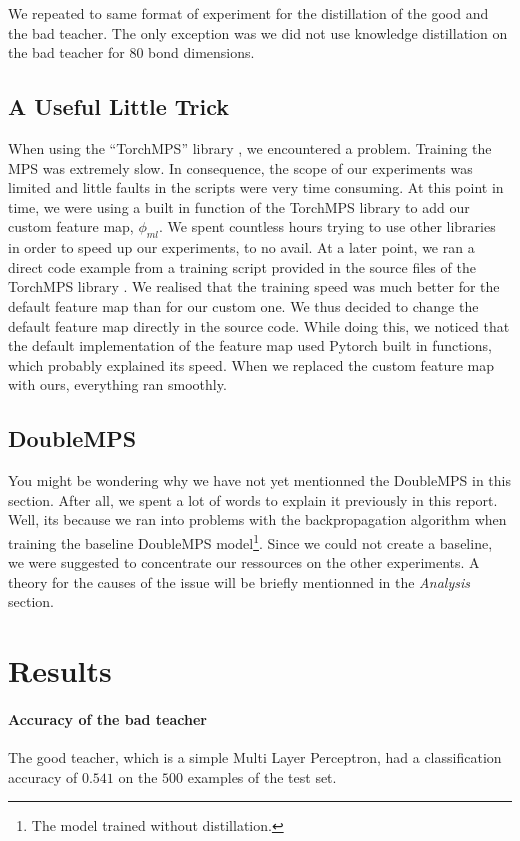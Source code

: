\documentclass{article}
\theoremstyle{definition}
\theoremstyle{definition}
\begin{document}
We repeated to same format of experiment for the distillation of the good and the bad teacher. The only exception was we did not use knowledge distillation on the bad teacher for $80$ bond dimensions.

\subsection{A Useful Little Trick}
When using the \enquote{TorchMPS} library \cite{torchmps}, we encountered a problem. Training the MPS was extremely slow. In consequence, the scope of our experiments was limited and little faults in the scripts were very time consuming. At this point in time, we were using a built in function of the TorchMPS library to add our custom feature map, $\phi_{ml}$. We spent countless hours trying to use other libraries in order to speed up our experiments, to no avail. At a later point, we ran a direct code example from a training script provided in the source files of the TorchMPS library \cite{torchmps}. We realised that the training speed was much better for the default feature map than for our custom one. We thus decided to change the default feature map directly in the source code. While doing this, we noticed that the default implementation of the feature map used Pytorch built in functions, which probably explained its speed. When we replaced the custom feature map with ours, everything ran smoothly.


\subsection{DoubleMPS}
You might be wondering why we have not yet mentionned the DoubleMPS in this section. After all, we spent a lot of words to explain it previously in this report. Well, its because we ran into problems with the backpropagation algorithm when training the baseline DoubleMPS model\footnote{The model trained without distillation.}. Since we could not create a baseline, we were suggested to concentrate our ressources on the other experiments. A theory for the causes of the issue will be briefly mentionned in the \emph{Analysis} section. 


\section{Results}
\paragraph{Accuracy of the bad teacher}
The good teacher, which is a simple Multi Layer Perceptron, had a classification accuracy of $0.541$ on the $500$ examples of the test set.
\end{document}
